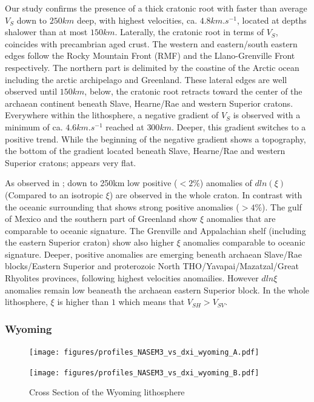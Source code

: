 \documentclass[12pt]{article}
\begin{document}

Our study confirms the presence of a thick cratonic root with faster than average $V_S$ down to $250km$ deep, with highest velocities, ca. $4.8km.s^{-1}$, located at depths shalower than at most $150km$. 
Laterally, the cratonic root in terms of $V_S$, coincides with precambrian aged crust. 
The western and eastern/south eastern edges follow the Rocky Mountain Front (RMF) and the Llano-Grenville Front respectively. 
The northern part is delimited by the coastine of the Arctic ocean including the arctic archipelago and Greenland. 
These lateral edges are well observed until $150km$, below, the cratonic root retracts toward the center of the archaean continent beneath Slave, Hearne/Rae and western Superior cratons. 
Everywhere within the lithosphere, a negative gradient of $V_S$ is observed with a minimum of ca. $4.6km.s^{-1}$ reached at $300km$. 
Deeper, this gradient switches to a positive trend. While the beginning of the negative gradient shows a topography, the bottom of the gradient located beneath Slave, Hearne/Rae and western Superior cratons; appears very flat.

As observed in \cite{gung2003global}; down to 250km low positive ($< 2\%$) anomalies of $dln(\xi)$ (Compared to an isotropic $\xi$) are observed in the whole craton. In contrast with the oceanic surrounding that shows strong positive anomalies ($> 4\%$). 
The gulf of Mexico and the southern part of Greenland show $\xi$ anomalies that are comparable to oceanic signature. 
The Grenville and Appalachian shelf (including the eastern Superior craton) show also higher $\xi$ anomalies comparable to oceanic signature. 
Deeper, positive anomalies are emerging beneath archaean Slave/Rae blocks/Eastern Superior and proterozoic North THO/Yavapai/Mazatzal/Great Rhyolites provinces, following highest velocities anomailies. However $dln\xi$ anomalies remain low beaneath the archaean eastern Superior block. 
In the whole lithosphere, $\xi$ is higher than $1$ which means that $V_{SH} > V_{SV}$. 


\subsubsection{Wyoming}
\begin{figure}[h]
	\begin{minipage}{0.5\linewidth}
		\centerline{\texttt{[image: figures/profiles\_NASEM3\_vs\_dxi\_wyoming\_A.pdf]}}
	\end{minipage}
	\hfill
	\begin{minipage}{0.5\linewidth}
		\centerline{\texttt{[image: figures/profiles\_NASEM3\_vs\_dxi\_wyoming\_B.pdf]}}
	\end{minipage}

	\caption{Cross Section of the Wyoming lithosphere}
	\label{wyomingcross}

\end{figure}
\end{document}
